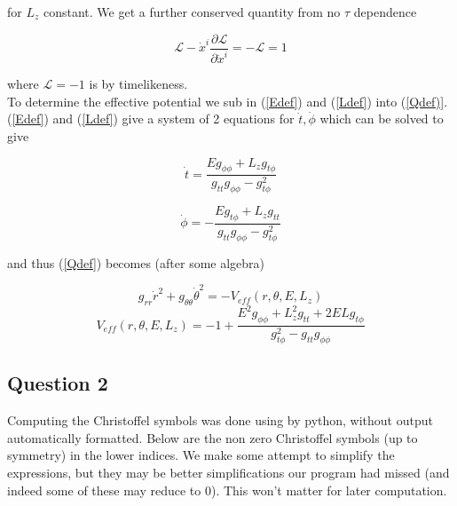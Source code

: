 \documentclass[10pt,a4paper]{report}
\begin{document}
for $L_z$ constant. We get a further conserved quantity from no $\tau$ dependence

\begin{equation}
\mathcal{L} - \dot{x}^i \frac{\partial \mathcal{L}}{\partial \dot{x}^i} = -\mathcal{L} = 1
\label{Qdef}
\end{equation}

where $\mathcal{L} = -1$ is by timelikeness.\\

To determine the effective potential we sub in (\ref{Edef}) and (\ref{Ldef}) into (\ref{Qdef)}. (\ref{Edef}) and (\ref{Ldef}) give a system of 2 equations for $\dot{t}, \dot{\phi}$ which can be solved to give

\begin{equation}
\dot{t} = \frac{Eg_{\phi\phi}+L_zg_{t\phi}}{g_{tt}g_{\phi\phi}-g_{t\phi}^2}
\end{equation}

\begin{equation}
\dot{\phi} = -\frac{Eg_{t\phi}+L_zg_{tt}}{g_{tt}g_{\phi\phi}-g_{t\phi}^2}
\end{equation}

and thus (\ref{Qdef}) becomes (after some algebra)

\begin{equation}
g_{rr}\dot{r}^2+g_{\theta\theta}\dot{\theta}^2 = -V_{eff}(r, \theta, E, L_z)
\label{effpot}
\end{equation}
\begin{equation*}
V_{eff}(r, \theta, E, L_z) = -1 + \frac{E^2g_{\phi\phi} + L_z^2g_{tt} + 2ELg_{t\phi}}{g_{t\phi}^2-g_{tt}g_{\phi\phi}}
\end{equation*}

\subsection*{Question 2}
Computing the Christoffel symbols was done using by python, without output automatically formatted. Below are the non zero Christoffel symbols (up to symmetry) in the lower indices. We make some attempt to simplify the expressions, but they may be better simplifications our program had missed (and indeed some of these may reduce to 0). This won't matter for later computation.
\end{document}
